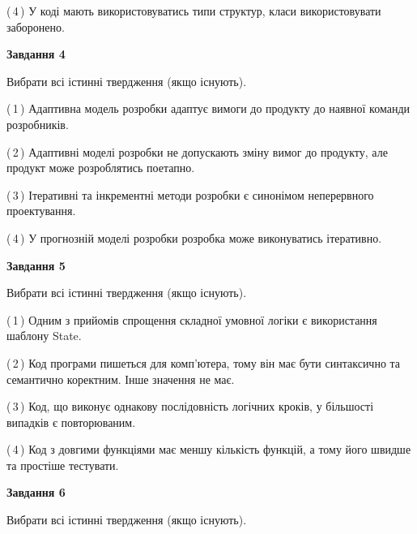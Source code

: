 \documentclass[10pt, ukrainian]{article}
\begin{document}
{\begin {large}
(\,4\,) У коді мають використовуватись типи структур, класи використовувати заборонено. %


{\begin {center}\textbf{Завдання 4}\end {center}}\par
Вибрати всі істинні твердження (якщо існують).\par
\vspace{2mm}



(\,1\,) Адаптивна модель розробки адаптує вимоги до продукту до наявної команди розробників. %



(\,2\,) Адаптивні моделі розробки не допускають зміну вимог до продукту, але продукт може розроблятись поетапно. %



(\,3\,) Ітеративні та інкрементні методи розробки є синонімом неперервного проектування. %



(\,4\,) У прогнозній моделі розробки розробка може виконуватись ітеративно. %


{\begin {center}\textbf{Завдання 5}\end {center}}\par
Вибрати всі істинні твердження (якщо існують).\par
\vspace{2mm}



(\,1\,) Одним з прийомів спрощення складної умовної логіки є використання шаблону State. %



(\,2\,) Код програми пишеться для комп'ютера, тому він має бути синтаксично та семантично коректним. Інше значення не має. %



(\,3\,) Код, що виконує однакову послідовність логічних кроків, у більшості випадків є повторюваним.%



(\,4\,) Код з довгими функціями має меншу кількість функцій, а тому його швидше та простіше тестувати. %

\newpage

{\begin {center}\textbf{Завдання 6}\end {center}}\par
Вибрати всі істинні твердження (якщо існують).\par
\vspace{2mm}




\end{large}}
\end{document}

